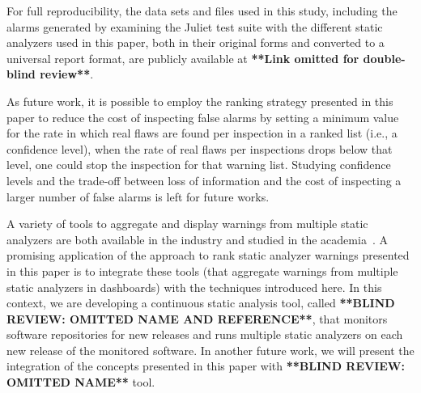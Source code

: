 For full reproducibility, the data sets and files used in this study,
including the alarms generated by examining the Juliet test suite with the
different static analyzers used in this paper, both in their original forms and
converted to a universal report format, are publicly available at
\textbf{**Link omitted for double-blind review**}.

As future work, it is possible to employ the ranking strategy presented in this
paper to reduce the cost of inspecting false alarms by setting a minimum value
for the rate in which real flaws are found per inspection in a ranked list
(i.e., a confidence level), when the rate of real flaws per inspections drops
below that level, one could stop the inspection for that warning list. Studying
confidence levels and the trade-off between loss of information and the cost of
inspecting a larger number of false alarms is left for future works.

A variety of tools to aggregate and display warnings from multiple static
analyzers are both available in the industry and studied in the
academia~\cite{buckers2017uav, heinemann2014teamscale}. A promising application
of the approach to rank static analyzer warnings presented in this paper is to
integrate these tools (that aggregate warnings from multiple static analyzers
in dashboards) with the techniques introduced here. In this context, we are
developing a continuous static analysis tool, called \textbf{**BLIND REVIEW:
OMITTED NAME AND REFERENCE**}, that monitors software repositories for new
releases and runs multiple static analyzers on each new release of the
monitored software.  In another future work, we will present the integration of
the concepts presented in this paper with \textbf{**BLIND REVIEW: OMITTED
NAME**} tool.
